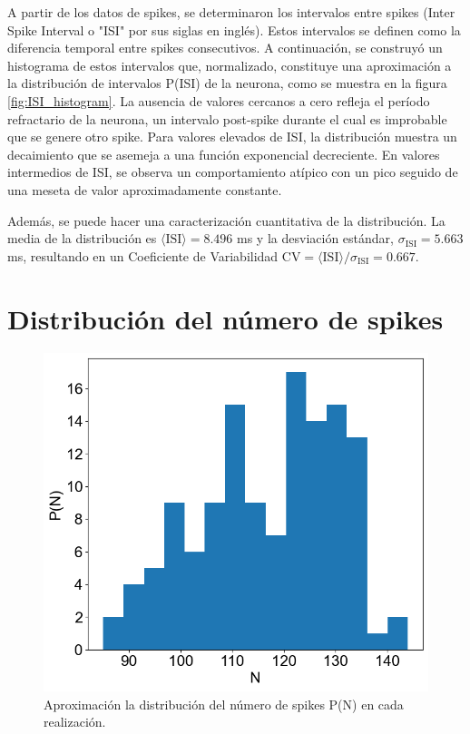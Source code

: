 \documentclass[aps,prb,twocolumn,superscriptaddress,floatfix,longbibliography]{revtex4-2}
\begin{document}
A partir de los datos de spikes, se determinaron los intervalos entre spikes (Inter Spike Interval o "ISI" por sus siglas en inglés). Estos intervalos se definen como la diferencia temporal entre spikes consecutivos. A continuación, se construyó un histograma de estos intervalos que, normalizado, constituye una aproximación a la distribución de intervalos P(ISI) de la neurona, como se muestra en la figura \ref{fig:ISI_histogram}. La ausencia de valores cercanos a cero refleja el período refractario de la neurona, un intervalo post-spike durante el cual es improbable que se genere otro spike. Para valores elevados de ISI, la distribución muestra un decaimiento que se asemeja a una función exponencial decreciente. En valores intermedios de ISI, se observa un comportamiento atípico con un pico seguido de una meseta de valor aproximadamente constante.

Además, se puede hacer una caracterización cuantitativa de la distribución. La media de la distribución es $\langle \mathrm{ISI} \rangle = 8.496$ ms y la desviación estándar, $\sigma_{\mathrm{ISI}} = 5.663$ ms, resultando en un Coeficiente de Variabilidad $\mathrm{CV} = \langle \mathrm{ISI} \rangle / \sigma_{\mathrm{ISI}} =  0.667$.

\section{Distribución del número de spikes}

\begin{figure}[h]
  \includegraphics[clip=true,width=0.9\columnwidth]{N_histogram.png}
  \caption{Aproximación la distribución del número de spikes P(N) en cada realización.}
   \label{fig:N_histogram}
\end{figure}
\end{document}
